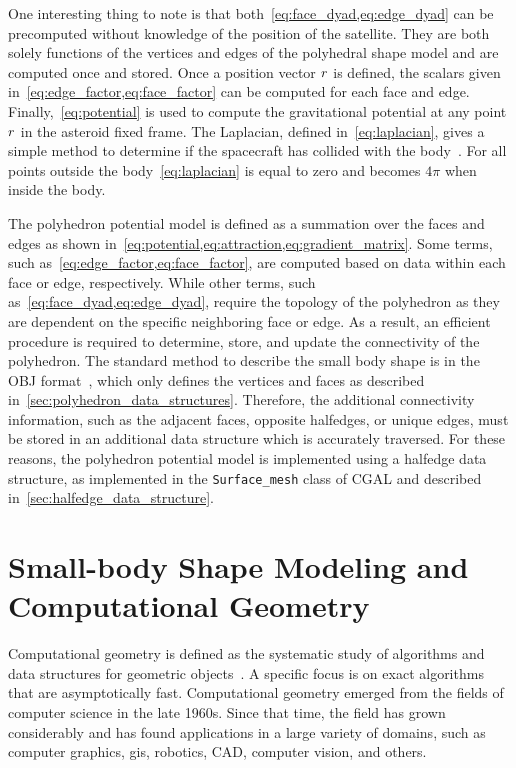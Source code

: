One interesting thing to note is that both~\cref{eq:face_dyad,eq:edge_dyad} can be precomputed without knowledge of the position of the satellite.
They are both solely functions of the vertices and edges of the polyhedral shape model and are computed once and stored.
Once a position vector \( r \) is defined, the scalars given in~\cref{eq:edge_factor,eq:face_factor} can be computed for each face and edge.
Finally,~\cref{eq:potential} is used to compute the gravitational potential at any point \( r \) in the asteroid fixed frame.
The Laplacian, defined in~\cref{eq:laplacian}, gives a simple method to determine if the spacecraft has collided with the body~\cite{werner1996}. 
For all points outside the body~\cref{eq:laplacian} is equal to zero and becomes \( 4 \pi \) when inside the body.

The polyhedron potential model is defined as a summation over the faces and edges as shown in~\cref{eq:potential,eq:attraction,eq:gradient_matrix}.
Some terms, such as~\cref{eq:edge_factor,eq:face_factor}, are computed based on data within each face or edge, respectively.
While other terms, such as~\cref{eq:face_dyad,eq:edge_dyad}, require the topology of the polyhedron as they are dependent on the specific neighboring face or edge.
As a result, an efficient procedure is required to determine, store, and update the connectivity of the polyhedron. 
The standard method to describe the small body shape is in the OBJ format~\cite{neese2004}, which only defines the vertices and faces as described in~\cref{sec:polyhedron_data_structures}.
Therefore, the additional connectivity information, such as the adjacent faces, opposite halfedges, or unique edges, must be stored in an additional data structure which is accurately traversed.
For these reasons, the polyhedron potential model is implemented using a halfedge data structure, as implemented in the \texttt{Surface\_mesh} class of CGAL and described in~\cref{sec:halfedge_data_structure}.

\section{Small-body Shape Modeling and Computational Geometry}\label{sec:computational_geometry}

Computational geometry is defined as the systematic study of algorithms and data structures for geometric objects~\cite{berg2008}.
A specific focus is on exact algorithms that are asymptotically fast.
Computational geometry emerged from the fields of computer science in the late 1960s.
Since that time, the field has grown considerably and has found applications in a large variety of domains, such as computer graphics, \gls{gis}, robotics, \gls{CAD}, computer vision, and others.

